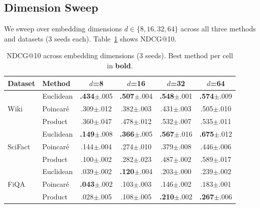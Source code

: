 \documentclass{article}
\begin{document}
\subsection{Dimension Sweep}

We sweep over embedding dimensions $d \in \{8, 16, 32, 64\}$ across all three methods and datasets (3 seeds each). Table~\ref{tab:dim_sweep} shows NDCG@10.

\begin{table}[h]
\centering
\small
\caption{NDCG@10 across embedding dimensions (3 seeds). Best method per cell in \textbf{bold}.}
\label{tab:dim_sweep}
\vspace{0.2cm}
\begin{tabular}{@{}llcccc@{}}
\toprule
Dataset & Method & $d$=8 & $d$=16 & $d$=32 & $d$=64 \\
\midrule
\multirow{3}{*}{Wiki}
& Euclidean  & \textbf{.434}{\scriptsize$\pm$.005} & \textbf{.507}{\scriptsize$\pm$.004} & \textbf{.548}{\scriptsize$\pm$.001} & \textbf{.574}{\scriptsize$\pm$.009} \\
& Poincar\'e & .309{\scriptsize$\pm$.012} & .382{\scriptsize$\pm$.003} & .431{\scriptsize$\pm$.003} & .505{\scriptsize$\pm$.010} \\
& Product    & .360{\scriptsize$\pm$.047} & .478{\scriptsize$\pm$.012} & .532{\scriptsize$\pm$.007} & .535{\scriptsize$\pm$.011} \\
\midrule
\multirow{3}{*}{SciFact}
& Euclidean  & \textbf{.149}{\scriptsize$\pm$.008} & \textbf{.366}{\scriptsize$\pm$.005} & \textbf{.567}{\scriptsize$\pm$.016} & \textbf{.675}{\scriptsize$\pm$.012} \\
& Poincar\'e & .144{\scriptsize$\pm$.004} & .274{\scriptsize$\pm$.010} & .379{\scriptsize$\pm$.008} & .446{\scriptsize$\pm$.006} \\
& Product    & .100{\scriptsize$\pm$.002} & .282{\scriptsize$\pm$.023} & .487{\scriptsize$\pm$.002} & .589{\scriptsize$\pm$.017} \\
\midrule
\multirow{3}{*}{FiQA}
& Euclidean  & .039{\scriptsize$\pm$.002} & \textbf{.120}{\scriptsize$\pm$.004} & .203{\scriptsize$\pm$.000} & .239{\scriptsize$\pm$.002} \\
& Poincar\'e & \textbf{.043}{\scriptsize$\pm$.002} & .103{\scriptsize$\pm$.003} & .146{\scriptsize$\pm$.002} & .183{\scriptsize$\pm$.001} \\
& Product    & .028{\scriptsize$\pm$.005} & .108{\scriptsize$\pm$.005} & \textbf{.210}{\scriptsize$\pm$.002} & \textbf{.267}{\scriptsize$\pm$.006} \\
\bottomrule
\end{tabular}
\end{table}
\end{document}
